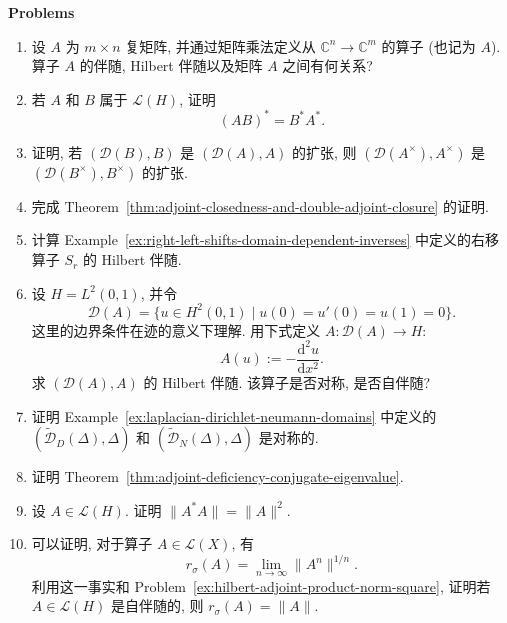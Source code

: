 \textbf{Problems}

\begin{enumerate}[label=\thesection.\arabic*.,ref=\thesection.\arabic*,start=24,series=book-problems]

\item\label{ex:complex-matrix-banach-hilbert-adjoints} 设 $A$ 为 $m\times n$ 复矩阵, 并通过矩阵乘法定义从 $\mathbb{C}^n\to\mathbb{C}^m$ 的算子 (也记为 $A$). 算子 $A$ 的伴随, Hilbert 伴随以及矩阵 $A$ 之间有何关系?

\item\label{ex:hilbert-adjoint-product-reversal} 若 $A$ 和 $B$ 属于 $\mathcal{L}(H)$, 证明\[(AB)^*=B^*A^*.\]

\item\label{ex:operator-extension-adjoint-reverse-extension} 证明, 若 $(\mathcal{D}(B),B)$ 是 $(\mathcal{D}(A),A)$ 的扩张, 则 $(\mathcal{D}(A^\times),A^\times)$ 是 $(\mathcal{D}(B^\times),B^\times)$ 的扩张.

\item\label{ex:adjoint-closure-theorem-proof-completion} 完成 Theorem~\ref{thm:adjoint-closedness-and-double-adjoint-closure} 的证明.

\item\label{ex:right-shift-hilbert-adjoint} 计算 Example~\ref{ex:right-left-shifts-domain-dependent-inverses} 中定义的右移算子 $S_r$ 的 Hilbert 伴随.

\item\label{ex:second-derivative-symmetric-not-self-adjoint} 设 $H=L^2(0,1)$, 并令\[\mathcal{D}(A)=\{u\in H^2(0,1)\mid u(0)=u'(0)=u(1)=0\}.\]这里的边界条件在迹的意义下理解. 用下式定义 $A:\mathcal{D}(A)\to H$:\[A(u):=-\dfrac{\mathrm{d}^2u}{\mathrm{d}x^2}.\]求 $(\mathcal{D}(A),A)$ 的 Hilbert 伴随. 该算子是否对称, 是否自伴随?

\item\label{ex:classical-laplacian-boundary-domains-symmetric} 证明 Example~\ref{ex:laplacian-dirichlet-neumann-domains} 中定义的 $(\widetilde{\mathcal{D}}_D(\Delta),\Delta)$ 和 $(\widetilde{\mathcal{D}}_N(\Delta),\Delta)$ 是对称的.

\item\label{ex:adjoint-deficiency-eigenvalue-proof} 证明 Theorem~\ref{thm:adjoint-deficiency-conjugate-eigenvalue}.

\item\label{ex:hilbert-adjoint-product-norm-square} 设 $A\in\mathcal{L}(H)$. 证明 $\|A^*A\|=\|A\|^2$.

\item\label{ex:self-adjoint-spectral-radius-equals-norm} 可以证明, 对于算子 $A\in\mathcal{L}(X)$, 有\[r_\sigma(A)=\lim_{n\to\infty}\|A^n\|^{1/n}.\]利用这一事实和 Problem~\ref{ex:hilbert-adjoint-product-norm-square}, 证明若 $A\in\mathcal{L}(H)$ 是自伴随的, 则 $r_\sigma(A)=\|A\|$.


\end{enumerate}
